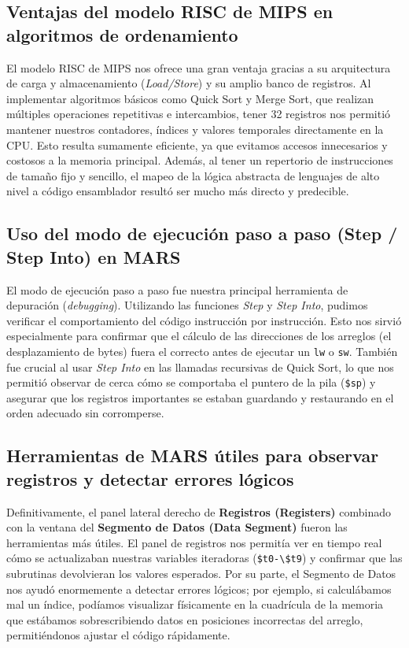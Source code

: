 \documentclass[12pt, a4paper]{article}
\begin{document}
        \subsection{Ventajas del modelo RISC de MIPS en algoritmos de ordenamiento}
            El modelo RISC de MIPS nos ofrece una gran ventaja gracias a su arquitectura de carga y almacenamiento (\textit{Load/Store}) y su amplio banco de registros. Al implementar algoritmos básicos como Quick Sort y Merge Sort, que realizan múltiples operaciones repetitivas e intercambios, tener 32 registros nos permitió mantener nuestros contadores, índices y valores temporales directamente en la CPU. Esto resulta sumamente eficiente, ya que evitamos accesos innecesarios y costosos a la memoria principal. Además, al tener un repertorio de instrucciones de tamaño fijo y sencillo, el mapeo de la lógica abstracta de lenguajes de alto nivel a código ensamblador resultó ser mucho más directo y predecible.

        \subsection{Uso del modo de ejecución paso a paso (Step / Step Into) en MARS}
            El modo de ejecución paso a paso fue nuestra principal herramienta de depuración (\textit{debugging}). Utilizando las funciones \textit{Step} y \textit{Step Into}, pudimos verificar el comportamiento del código instrucción por instrucción. Esto nos sirvió especialmente para confirmar que el cálculo de las direcciones de los arreglos (el desplazamiento de bytes) fuera el correcto antes de ejecutar un \lstinline|lw| o \lstinline|sw|. También fue crucial al usar \textit{Step Into} en las llamadas recursivas de Quick Sort, lo que nos permitió observar de cerca cómo se comportaba el puntero de la pila (\lstinline|$sp|) y asegurar que los registros importantes se estaban guardando y restaurando en el orden adecuado sin corromperse.

        \subsection{Herramientas de MARS útiles para observar registros y detectar errores lógicos}
            Definitivamente, el panel lateral derecho de \textbf{Registros (Registers)} combinado con la ventana del \textbf{Segmento de Datos (Data Segment)} fueron las herramientas más útiles. El panel de registros nos permitía ver en tiempo real cómo se actualizaban nuestras variables iteradoras (\lstinline|$t0-\$t9|) y confirmar que las subrutinas devolvieran los valores esperados. Por su parte, el Segmento de Datos nos ayudó enormemente a detectar errores lógicos; por ejemplo, si calculábamos mal un índice, podíamos visualizar físicamente en la cuadrícula de la memoria que estábamos sobrescribiendo datos en posiciones incorrectas del arreglo, permitiéndonos ajustar el código rápidamente.
\end{document}
